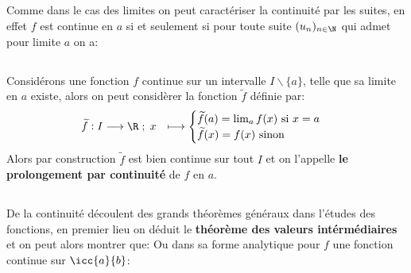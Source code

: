 \subsection*{}

Comme dans le cas des limites on peut caractériser la continuité par les suites, en effet \(f\) est continue en \(a\) si et seulement si pour toute suite \((u_n)_{n\in\N}\) qui admet pour limite \(a\) on a:

\subsection*{}

Considérons une fonction \(f\) continue sur un intervalle \(I \backslash \{a\}\), telle que sa limite en \(a\) existe, alors on peut considèrer la fonction \(\widetilde{f}\) définie par:
\[
   \begin{aligned}
      \widetilde{f}: I &\longrightarrow \R \; ; \; x &\longmapsto \begin{cases}
         \widetilde{f}(a) = \lim_{a} f(x) \text{ si } x = a\\
         \widetilde{f}(x) = f(x) \text{ sinon}
      \end{cases}
   \end{aligned}
\]
Alors par construction \(\widetilde{f}\) est bien continue sur tout \(I\) et on l'appelle \textbf{le prolongement par continuité} de \(f\) en \(a\).

\subsection*{}

De la continuité découlent des grands théorèmes généraux dans l'études des fonctions, en premier lieu on déduit le \textbf{théorème des valeurs intérmédiaires} et on peut alors montrer que:
Ou dans sa forme analytique pour \(f\) une fonction continue sur \(\icc{a}{b}\):

